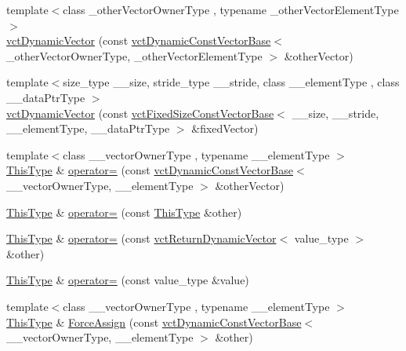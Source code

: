 \begin{DoxyCompactItemize}
\item 
{\footnotesize template$<$class \+\_\+other\+Vector\+Owner\+Type , typename \+\_\+other\+Vector\+Element\+Type $>$ }\\\hyperlink{classvct_dynamic_vector_a0ac208d49e93ac6a58c66be51123711c}{vct\+Dynamic\+Vector} (const \hyperlink{classvct_dynamic_const_vector_base}{vct\+Dynamic\+Const\+Vector\+Base}$<$ \+\_\+other\+Vector\+Owner\+Type, \+\_\+other\+Vector\+Element\+Type $>$ \&other\+Vector)
\item 
{\footnotesize template$<$size\+\_\+type \+\_\+\+\_\+size, stride\+\_\+type \+\_\+\+\_\+stride, class \+\_\+\+\_\+element\+Type , class \+\_\+\+\_\+data\+Ptr\+Type $>$ }\\\hyperlink{classvct_dynamic_vector_ac69e9fe1929ddeacc2366ec99a60ed06}{vct\+Dynamic\+Vector} (const \hyperlink{classvct_fixed_size_const_vector_base}{vct\+Fixed\+Size\+Const\+Vector\+Base}$<$ \+\_\+\+\_\+size, \+\_\+\+\_\+stride, \+\_\+\+\_\+element\+Type, \+\_\+\+\_\+data\+Ptr\+Type $>$ \&fixed\+Vector)
\item 
{\footnotesize template$<$class \+\_\+\+\_\+vector\+Owner\+Type , typename \+\_\+\+\_\+element\+Type $>$ }\\\hyperlink{classvct_dynamic_const_vector_base_a39da273523717f678f54d3321ebca3dd}{This\+Type} \& \hyperlink{classvct_dynamic_vector_aa7275eb4c8453bec0358bab942e4d20f}{operator=} (const \hyperlink{classvct_dynamic_const_vector_base}{vct\+Dynamic\+Const\+Vector\+Base}$<$ \+\_\+\+\_\+vector\+Owner\+Type, \+\_\+\+\_\+element\+Type $>$ \&other\+Vector)
\item 
\hyperlink{classvct_dynamic_const_vector_base_a39da273523717f678f54d3321ebca3dd}{This\+Type} \& \hyperlink{classvct_dynamic_vector_a64bfe8d3fa623848a4cd42a66d747037}{operator=} (const \hyperlink{classvct_dynamic_const_vector_base_a39da273523717f678f54d3321ebca3dd}{This\+Type} \&other)
\item 
\hyperlink{classvct_dynamic_const_vector_base_a39da273523717f678f54d3321ebca3dd}{This\+Type} \& \hyperlink{classvct_dynamic_vector_a76be8aa85264ea353998537ab80c17ce}{operator=} (const \hyperlink{classvct_return_dynamic_vector}{vct\+Return\+Dynamic\+Vector}$<$ value\+\_\+type $>$ \&other)
\item 
\hyperlink{classvct_dynamic_const_vector_base_a39da273523717f678f54d3321ebca3dd}{This\+Type} \& \hyperlink{classvct_dynamic_vector_a0b2769b4d636aeb65db364995f69550c}{operator=} (const value\+\_\+type \&value)
\item 
{\footnotesize template$<$class \+\_\+\+\_\+vector\+Owner\+Type , typename \+\_\+\+\_\+element\+Type $>$ }\\\hyperlink{classvct_dynamic_const_vector_base_a39da273523717f678f54d3321ebca3dd}{This\+Type} \& \hyperlink{classvct_dynamic_vector_a0dadd9f4a34f6c698597c46c101c3e10}{Force\+Assign} (const \hyperlink{classvct_dynamic_const_vector_base}{vct\+Dynamic\+Const\+Vector\+Base}$<$ \+\_\+\+\_\+vector\+Owner\+Type, \+\_\+\+\_\+element\+Type $>$ \&other)

\end{DoxyCompactItemize}
